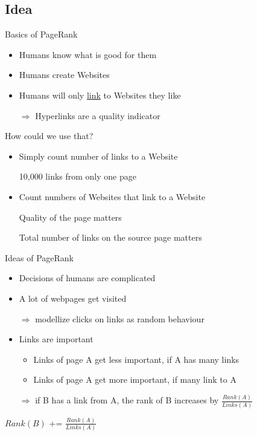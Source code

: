 \subsection{Idea}
\begin{frame}{Basics of PageRank}
    \begin{itemize}[<+->]
        \item Humans know what is good for them
        \item Humans create Websites
        \item Humans will only \href{http://en.wikipedia.org/wiki/Hyperlink}{link} to Websites they like
        \item[$\Rightarrow$] Hyperlinks are a quality indicator
    \end{itemize}
\end{frame}

\begin{frame}{How could we use that?}
    \begin{itemize}[<+->]
        \item Simply count number of links to a Website
        \item[\xmark] 10,000 links from only one page
        \item Count numbers of Websites that link to a Website
        \item[\xmark] Quality of the page matters
        \item[\xmark] Total number of links on the source page matters
    \end{itemize}
\end{frame}


\begin{frame}{Ideas of PageRank}
    \begin{itemize}[<+->]
        \item Decisions of humans are complicated
        \item A lot of webpages get visited
        \item[$\Rightarrow$] modellize clicks on links as random behaviour
        \item Links are important
        \begin{itemize}
            \item Links of page A get less important, if A has many links
            \item Links of page A get more important, if many link to A
        \end{itemize}
        \item[$\Rightarrow$] if B has a link from A, the rank of B increases by $\frac{Rank(A)}{Links(A)}$
    \end{itemize}

    \pause[\thebeamerpauses]

    \begin{algorithmic}
            \State $Rank(B)$ += $\frac{Rank(A)}{Links(A)}$
        \EndIf
    \end{algorithmic}
\end{frame}

